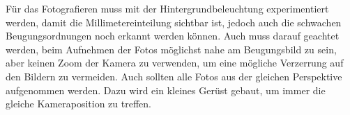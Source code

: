 \documentclass[12pt,english,ngerman]{scrartcl}
\begin{document}
Für das Fotografieren muss mit der Hintergrundbeleuchtung experimentiert werden, damit die Millimetereinteilung sichtbar ist,
jedoch auch die schwachen Beugungsordnungen noch erkannt werden können. Auch muss darauf geachtet werden, beim Aufnehmen der
Fotos möglichst nahe am Beugungsbild zu sein, aber keinen Zoom der Kamera zu verwenden, um eine mögliche Verzerrung auf den 
Bildern zu vermeiden. Auch sollten alle Fotos aus der gleichen Perspektive aufgenommen werden. Dazu wird ein kleines Gerüst
gebaut, um immer die gleiche Kameraposition zu treffen.

\begin{figure}[H]
	 \hfill


\end{figure}
\end{document}
